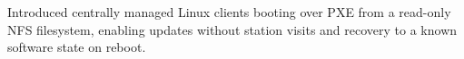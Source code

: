 Introduced centrally managed Linux clients booting over PXE from a read-only NFS filesystem, enabling updates without station visits and recovery to a known software state on reboot.

